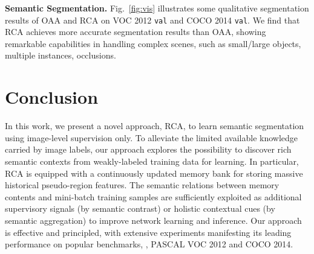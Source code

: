 \documentclass[10pt,twocolumn,letterpaper]{article}
\begin{document}
\noindent\textbf{Semantic Segmentation.} Fig.~\ref{fig:vis} illustrates some qualitative segmentation results of OAA and  RCA on  VOC 2012 \texttt{val} and COCO 2014 \texttt{val}. We find that RCA achieves more accurate segmentation results than OAA, showing remarkable capabilities in handling complex scenes, such as  small/large objects, multiple instances, occlusions.



























\section{Conclusion}

In this work, we present a novel approach, RCA, to learn semantic segmentation using image-level supervision only. To alleviate the limited available knowledge carried by image labels, our approach explores the possibility to discover rich semantic contexts from weakly-labeled training data for  learning. In particular, RCA is equipped with a continuously updated memory bank for storing massive historical pseudo-region features. The semantic relations between memory contents and mini-batch training samples are sufficiently exploited as additional supervisory signals (by semantic contrast) or holistic contextual cues (by semantic aggregation) to improve network learning and inference. Our approach is effective and principled, with extensive experiments manifesting its leading performance on popular benchmarks, \ie, PASCAL VOC 2012 and COCO 2014.





{
\small


}
\end{document}
